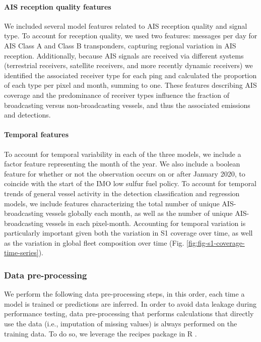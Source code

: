 \documentclass[lineno,pdflatex,sn-nature]{sn-jnl}
\begin{document}
\paragraph{AIS reception quality features}

We included several model features related to AIS reception quality and signal type. To account for reception quality, we used two features: messages per day for AIS Class A and Class B transponders, capturing regional variation in AIS reception. Additionally, because AIS signals are received via different systems (terrestrial receivers, satellite receivers, and more recently dynamic receivers) we identified the associated receiver type for each ping and calculated the proportion of each type per pixel and month, summing to one. These features describing AIS coverage and the predominance of receiver types influence the fraction of broadcasting versus non-broadcasting vessels, and thus the associated emissions and detections.

\paragraph{Temporal features}

To account for temporal variability in each of the three models, we include a factor feature representing the month of the year. We also include a boolean feature for whether or not the observation occurs on or after January 2020, to coincide with the start of the IMO low sulfur fuel policy. To account for temporal trends of general vessel activity in the detection classification and regression models, we include features characterizing the total number of unique AIS-broadcasting vessels globally each month, as well as the number of unique AIS-broadcasting vessels in each pixel-month. Accounting for temporal variation is particularly important given both the variation in S1 coverage over time, as well as the variation in global fleet composition over time (Fig. \ref{fig:fig-s1-coverage-time-series}).

\subsubsection{Data pre-processing}

We perform the following data pre-processing steps, in this order, each time a model is trained or predictions are inferred. In order to avoid data leakage during performance testing, data pre-processing that performs calculations that directly use the data (i.e., imputation of missing values) is always performed  on the training data. To do so, we leverage the recipes package in R \cite{recipes}.
\end{document}
